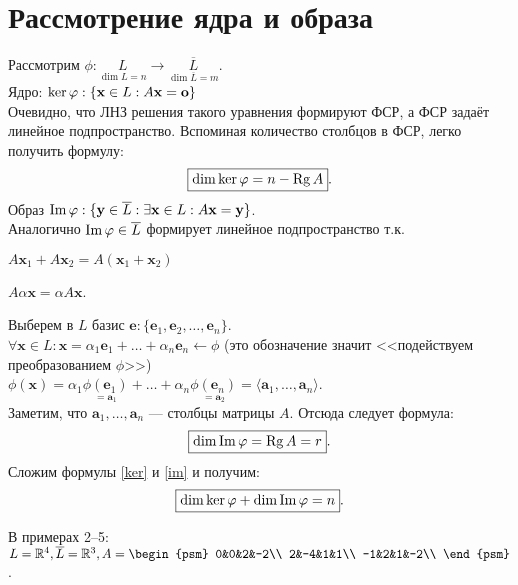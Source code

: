 \section{Рассмотрение ядра и образа}
Рассмотрим $\phi: \underset{\dim L=n}{L}\rightarrow \underset{\dim \overline{L}=m}{\overline{L}}$.\\
Ядро: $\ker\phi: \{\textbf{x} \in L: A\textbf{\textbf{x}}=\textbf{o}\}$\\
Очевидно, что ЛНЗ решения такого уравнения формируют ФСР, а ФСР задаёт линейное подпространство. Вспоминая количество столбцов в ФСР, легко получить формулу:
\begin{equation}
\boxed{\dim\ker\phi=n-\Rg A}.
\label{ker}
\end{equation}
Образ $\im\phi: \{\textbf{y} \in \overline{L}:\exists \textbf{x}\in L: A\textbf{x}=\textbf{y}\}$.\\
Аналогично $\im\phi \in \overline{L}$ формирует линейное подпространство т.к.
\begin{center}
$
A\textbf{x$_1$}+A\textbf{x$_2$}=A(\textbf{x$_1$}+\textbf{x$_2$})$

$A\alpha \textbf{x}=\alpha A\textbf{x}$.
\end{center}
Выберем в $L$ базис $\textbf{e}:\{\textbf{e$_1$}, \textbf{e$_2$}, \dots, \textbf{e$_n$}\}$.\\
$\forall \textbf{x} \in L: \textbf{x}=\alpha_1\textbf{e$_1$}+\dots+\alpha_n\textbf{e$_n$} \leftarrow \phi$ (это обозначение значит <<подействуем преобразованием $\phi$>>)\\
$\phi(\textbf{x})=\alpha_1 \underset{=\textbf{a$_1$}}{\phi(\textbf{e$_1$})}+\dots+\alpha_n \underset{=\textbf{a$_2$}}{\phi(\textbf{e$_n$})}=\langle \textbf{a$_1$},\dots, \textbf{a$_n$}\rangle$.\\
Заметим, что $\textbf{a$_1$},\dots, \textbf{a$_n$}$ --- столбцы матрицы $A$. Отсюда следует формула:
\begin{equation}
\boxed{\dim\im\phi=\Rg A=r}.
\label{im}
\end{equation}
Сложим формулы \eqref{ker} и \eqref{im} и получим:
\begin{equation}
\boxed{\dim\ker\phi+\dim\im\phi=n}.
\end{equation}
\begin{center}
В примерах 2--5: $L=\mathbb{R}^4, \overline{L}=\mathbb{R}^3, A=\begin{psm}
0&0&2&-2\\
2&-4&1&1\\
-1&2&1&-2\\
\end{psm}$.
\end{center}
